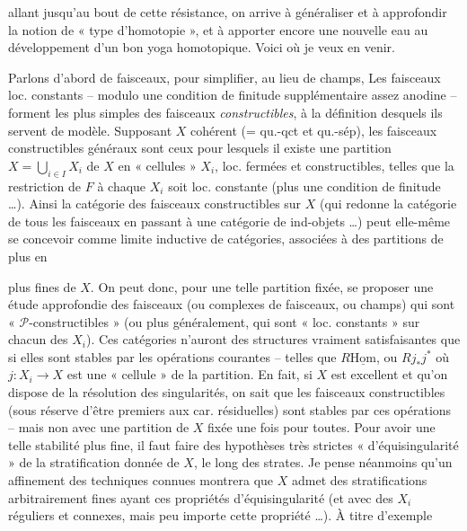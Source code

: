 \documentclass[11pt,a4paper]{article}
\begin{document}
allant jusqu'au bout de cette résistance, on arrive à généraliser et à approfondir la notion de « type d'homotopie », et à apporter encore une nouvelle eau au \ill{} développement d'un bon yoga homotopique. Voici où je veux en venir. \add{(\ill{})}

Parlons d'abord de faisceaux, pour simplifier, au lieu de champs,  Les faisceaux loc. constants -- modulo une condition de finitude supplémentaire assez anodine -- forment les plus simples des faisceaux \emph{constructibles}, à la définition desquels ils servent de modèle. Supposant $X$ cohérent (= qu.-qct et qu.-sép), les faisceaux constructibles généraux sont ceux pour lesquels il existe une partition  $X = \bigcup_{i \in I} X_i$ de $X$ en « cellules »  $X_i$, loc. fermées et constructibles, telles que \struck{\ill{}} la restriction de $F$ à chaque $X_i$ soit loc. constante  (plus une condition de finitude …). Ainsi la catégorie des faisceaux constructibles sur $X$ (qui redonne la catégorie de tous les faisceaux en passant à une catégorie de ind-objets …) peut elle-même se concevoir comme limite inductive de catégories, associées à des partitions de plus en

plus fines de $X$. On peut donc, pour une telle partition  fixée, se proposer une étude approfondie  des faisceaux (ou complexes de faisceaux, ou champs) qui sont « $\mathcal{P}$-constructibles » (ou plus généralement, qui sont « loc. constants » sur chacun des $X_i$). Ces catégories n'auront des structures vraiment satisfaisantes que si  elles sont stables par les opérations courantes -- telles que $R\underline{\mathrm{Hom}}$, ou $Rj_*j^*$ où $j : X_i \to X$ est une « cellule » de la partition. En fait, si $X$ est excellent et qu'on dispose de la résolution des singularités, on sait que les faisceaux  constructibles (sous réserve d'être premiers aux car. résiduelles) sont stables par \struck{\ill{}} ces opérations -- mais non avec une partition de $X$ fixée une fois pour toutes. Pour avoir une telle stabilité plus fine, il faut faire des hypothèses très strictes \struck{\ill{}} « d'équisingularité » de la stratification donnée de $X$, le long des strates. Je pense néanmoins qu'un affinement des techniques connues montrera que $X$ admet des stratifications arbitrairement fines ayant ces propriétés d'équisingularité (et avec des $X_i$ réguliers et connexes, mais peu importe \struck{\ill{}} cette propriété  …). À titre d'exemple
\end{document}
